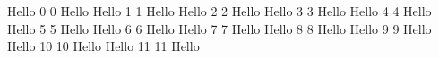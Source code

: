 \documentclass[12pt]{article}
\begin{document}
Hello 0
0 Hello
\newpage
Hello 1
1 Hello
\newpage
Hello 2
2 Hello
\newpage
Hello 3
3 Hello
\newpage
Hello 4
4 Hello
\newpage
Hello 5
5 Hello
\newpage
Hello 6
6 Hello
\newpage
Hello 7
7 Hello
\newpage
Hello 8
8 Hello
\newpage
Hello 9
9 Hello
\newpage
Hello 10
10 Hello
\newpage
Hello 11
11 Hello
\newpage
\end{document}
